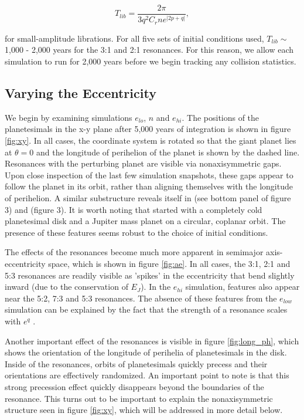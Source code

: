 \documentclass[onecolumn]{aastex63}
\begin{document}
\begin{equation}\label{eq:lib_time}
	T_{lib} = \frac{2 \pi}{3 q^{2} C_{r} n e^{\left| 2p + q \right|}},
\end{equation}

\noindent for small-amplitude librations. For all five sets of initial conditions used, $T_{lib} \sim$ 1,000 - 2,000 years for the 3:1 and 2:1 resonances. For this reason, we allow each simulation to run for 2,000 years before we begin tracking any collision statistics.

\subsection{Varying the Eccentricity}

We begin by examining simulations $e_{lo}$, $n$ and $e_{hi}$. The positions of the planetesimals in the x-y plane after 5,000 years of integration is shown in figure \ref{fig:xy}. In all cases, the coordinate system is rotated so that the giant planet lies at $\theta = 0$ and the longitude of perihelion of the planet is shown by the dashed line. Resonances with the perturbing planet are visible via nonaxisymmetric gaps. Upon close inspection of the last few simulation snapshots, these gaps appear to follow the planet in its orbit, rather than aligning themselves with the longitude of perihelion. A similar substructure reveals itself in \citet{2000Icar..143...45R} (see bottom panel of figure 3) and \citet{2016ApJ...818..159T} (figure 3). It is worth noting that \citet{2000Icar..143...45R} started with a completely cold planetesimal disk and a Jupiter mass planet on a circular, coplanar orbit. The presence of these features seems robust to the choice of initial conditions.

The effects of the resonances become much more apparent in semimajor axis-eccentricity space, which is shown in figure \ref{fig:ae}. In all cases, the 3:1, 2:1 and 5:3 resonances are readily visible as 'spikes' in the eccentricity that bend slightly inward (due to the conservation of $E_{J}$). In the $e_{hi}$ simulation, features also appear near the 5:2, 7:3 and 5:3 resonances. The absence of these features from the $e_{low}$ simulation can be explained by the fact that the strength of a resonance scales with $e^{q}$ \citep{1994PhyD...77..289M}.

Another important effect of the resonances is visible in figure \ref{fig:long_ph}, which shows the orientation of the longitude of perihelia of planetesimals in the disk. Inside of the resonances, orbits of planetesimals quickly precess and their orientations are effectively randomized. An important point to note is that this strong precession effect quickly disappears beyond the boundaries of the resonance. This turns out to be important to explain the nonaxisymmetric structure seen in figure \ref{fig:xy}, which will be addressed in more detail below.
\end{document}
